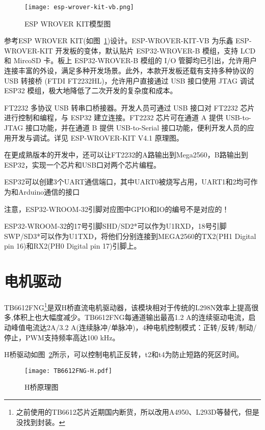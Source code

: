 \begin{figure}[htbp]
    \centering
    \texttt{[image: esp-wrover-kit-vb.png]}
    \caption{ESP WROVER KIT模型图}
    \label{fig:ESP32-WROVER}
\end{figure}

参考ESP WROVER KIT(如图~\ref{fig:ESP32-WROVER})设计。ESP-WROVER-KIT-VB 为乐鑫 ESP-WROVER-KIT 开发板的变体，默认贴片 ESP32-WROVER-B 模组，支持 LCD 和 MircoSD 卡。板上 ESP32-WROVER-B 模组的 I/O 管脚均已引出，允许用户连接丰富的外设，满足多种开发场景。此外，本款开发板还载有支持多种协议的 USB 转接桥 (FTDI FT2232HL)，允许用户直接通过 USB 接口使用 JTAG 调试 ESP32 模组，极大地降低了二次开发的复杂度和成本。

FT2232 多协议 USB 转串口桥接器。开发人员可通过 USB 接口对 FT2232 芯片进行控制和编程，与 ESP32 建立连接。FT2232 芯片可在通道 A 提供 USB-to-JTAG 接口功能，并在通道 B 提供 USB-to-Serial 接口功能，便利开发人员的应用开发与调试。详见 ESP-WROVER-KIT V4.1 原理图。

在更成熟版本的开发中，还可以让FT2232的A路输出到Mega2560，B路输出到ESP32，实现一个芯片和USB口对两个芯片编程。

ESP32可以创建3个UART通信端口，其中UART0被烧写占用，UART1和2均可作为和Arduino通信的接口

注意，ESP32-WROOM-32引脚对应图中GPIO和IO的编号不是对应的！

ESP32-WROOM-32的17号引脚SHD/SD2*可以作为U1RXD，18号引脚SWP/SD3*可以作为U1TXD，将他们分别连接到MEGA2560的TX2(PH1 Digital pin 16)和RX2(PH0 Digital pin 17)引脚上。


\section{电机驱动}

TB6612FNG\footnote{之前使用的TB6612芯片近期国内断货，所以改用A4950、L293D等替代，但是没找到封装。}是双H桥直流电机驱动器，该模块相对于传统的L298N效率上提高很多,体积上也大幅度减少。TB6612FNG每通道输出最高1.2 A的连续驱动电流，启动峰值电流达2A/3.2 A(连续脉冲/单脉冲)，4种电机控制模式：正转/反转/制动/停止，PWM支持频率高达100 kHz。

H桥驱动如图~\ref{fig:TB6612FNG-H}所示，可以控制电机正反转，t2和t4为防止短路的死区时间。

\begin{figure}[htbp]
    \centering
    \texttt{[image: TB6612FNG-H.pdf]}
    \caption{H桥原理图}
    \label{fig:TB6612FNG-H}
\end{figure}

